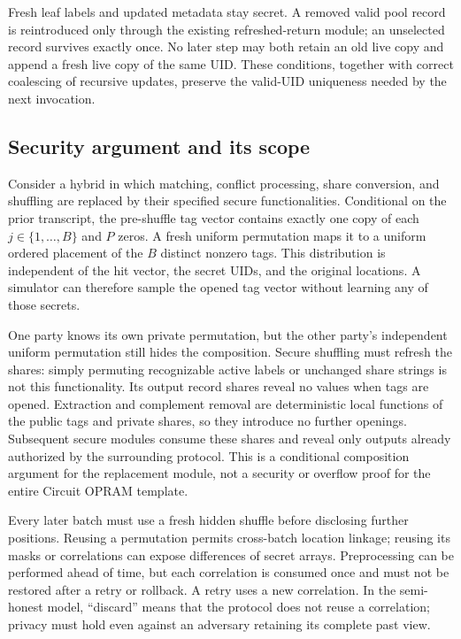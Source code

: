 \documentclass[11pt]{article}
\begin{document}
Fresh leaf labels and updated metadata stay secret.  A removed valid pool
record is reintroduced only through the existing refreshed-return module;
an unselected record survives exactly once.  No later step may both retain
an old live copy and append a fresh live copy of the same UID.  These
conditions, together with correct coalescing of recursive updates, preserve
the valid-UID uniqueness needed by the next invocation.

\subsection{Security argument and its scope}

Consider a hybrid in which matching, conflict processing, share conversion,
and shuffling are replaced by their specified secure functionalities.
Conditional on the prior transcript, the pre-shuffle tag vector contains
exactly one copy of each $j\in\{1,\ldots,B\}$ and $P$ zeros.  A fresh
uniform permutation maps it to a uniform ordered placement of the $B$
distinct nonzero tags.  This distribution is independent of the hit vector,
the secret UIDs, and the original locations.  A simulator can therefore
sample the opened tag vector without learning any of those secrets.

One party knows its own private permutation, but the other party's
independent uniform permutation still hides the composition.  Secure
shuffling must refresh the shares: simply permuting recognizable active
labels or unchanged share strings is not this functionality.  Its output
record shares reveal no values when tags are opened.  Extraction and
complement removal are deterministic local functions of the public tags
and private shares, so they introduce no further openings.  Subsequent
secure modules consume these shares and reveal only outputs already
authorized by the surrounding protocol.  This is a conditional composition
argument for the replacement module, not a security or overflow proof for
the entire Circuit OPRAM template.

Every later batch must use a fresh hidden shuffle before disclosing further
positions.  Reusing a permutation permits cross-batch location linkage;
reusing its masks or correlations can expose differences of secret arrays.
Preprocessing can be performed ahead of time, but each correlation is
consumed once and must not be restored after a retry or rollback.  A retry
uses a new correlation.  In the semi-honest model, ``discard'' means that
the protocol does not reuse a correlation; privacy must hold even against
an adversary retaining its complete past view.
\end{document}
